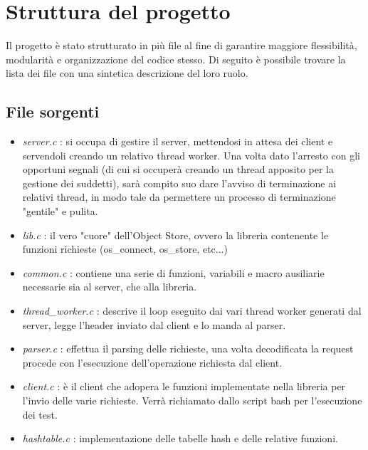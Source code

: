 \section{Struttura del progetto}
\begin{flushleft}

Il progetto è stato strutturato in più file al fine di garantire maggiore flessibilità, modularità e organizzazione del codice stesso. Di seguito è possibile trovare la lista dei file con una sintetica descrizione del loro ruolo.

\subsection{File sorgenti}
\begin{itemize}
	\item \emph{server.c} : si occupa di gestire il server, mettendosi in attesa dei client e servendoli creando un relativo thread worker. Una volta
	dato l'arresto con gli opportuni segnali (di cui si occuperà creando un thread apposito per la gestione dei suddetti), sarà compito suo dare l'avviso di terminazione ai relativi thread, in modo tale da permettere un processo di terminazione "gentile" e pulita. 
	
	\item \emph{lib.c} : il vero "cuore" dell'Object Store, ovvero la libreria contenente le funzioni richieste (os\_connect, os\_store, etc...)
	
	\item \emph{common.c} : contiene una serie di funzioni, variabili e macro ausiliarie necessarie sia al server, che alla libreria.
	
	\item \emph{thread\_worker.c} : descrive il loop eseguito dai vari thread worker generati dal server, legge l'header inviato dal client e lo manda al parser.
	
	\item \emph{parser.c} : effettua il parsing delle richieste, una volta decodificata la request procede con l'esecuzione dell'operazione richiesta dal client.
	
	\item \emph{client.c} : è il client che adopera le funzioni implementate nella libreria per l'invio delle varie richieste. Verrà richiamato dallo script bash per l'esecuzione dei test.
	
	\item \emph{hashtable.c} : implementazione delle tabelle hash e delle relative funzioni.

\end{itemize}


\end{flushleft}

